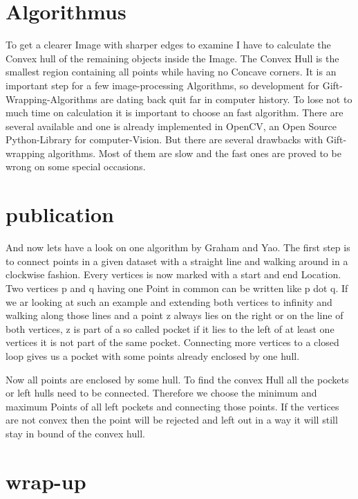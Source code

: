 \documentclass[10pt,a4paper]{article}
\begin{document}
	\section{Algorithmus}
	To get a clearer Image with sharper edges to examine I have to calculate the Convex hull of the remaining objects inside the Image.
	The Convex Hull is the smallest region containing all points while having no Concave corners.
	It is an important step for a few image-processing Algorithms, so development for  Gift-Wrapping-Algorithms are dating back quit far in computer history.	
	To lose not to much time on calculation it is important to choose an fast algorithm.
	There are several available and one is already implemented in OpenCV, an Open Source Python-Library for computer-Vision.
	But there are several drawbacks with Gift-wrapping algorithms.
	Most of them are slow and the fast ones are proved to be wrong on some special occasions.
	
	\section{publication}
	And now lets have a look on one algorithm by Graham and Yao.
	The first step is to connect points in a given dataset with a straight line and walking around in a clockwise fashion.  
	Every vertices is now marked with a start and end Location.
	Two vertices p and q having one Point in common can be written like p dot q.
	If we ar looking at such an example and extending both vertices to infinity and walking along those lines and a point z always lies on the right or on the line of both vertices, z is part of a so called pocket 
	if it lies to the left of at least one vertices it is not part of the same pocket.
	Connecting more vertices to a closed loop gives us a pocket with some points already enclosed by one hull.
	
	Now all points are enclosed by some hull. To find the convex Hull all the pockets or left hulls need to be connected.
	Therefore we choose the minimum and maximum Points of all left pockets and connecting those points. If the vertices are not convex then the point will be rejected and left out in a way it will still stay in bound of the convex hull.
	
	
	\section{wrap-up}
	
\end{document}
